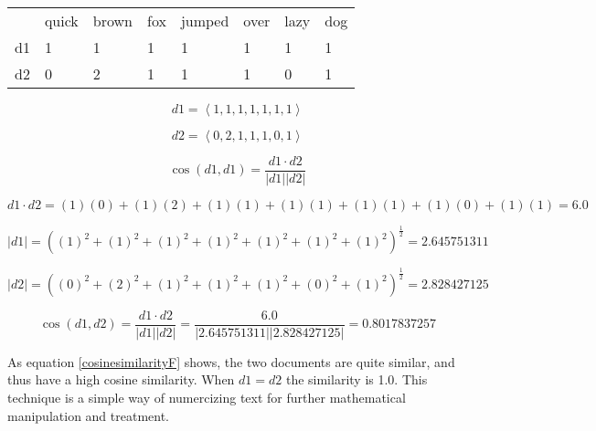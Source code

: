 \documentclass[12pt]{article}
\begin{document}
\begin{doublespacing}
\begin{table} \label{termtable}
    \begin{tabular}{llllllll}
    ~  & quick & brown & fox & jumped & over & lazy & dog \\
    d1 & 1     & 1     & 1   & 1      & 1    & 1    & 1   \\
    d2 & 0     & 2     & 1   & 1      & 1    & 0    & 1   \\
    \end{tabular}
\end{table}

\begin{equation} \label{d1termvector}
d1 = \left< 1, 1, 1, 1, 1, 1, 1 \right>
\end{equation}

\begin{equation} \label{d2termvector}
d2 = \left< 0, 2, 1, 1, 1, 0, 1 \right>
\end{equation}

\begin{equation} \label{cosinesimilarity}
\cos (d1,d1) = \frac{d1 \cdot d2 }{\left| d1 \right| \left| d2 \right|} 
\end{equation}

\begin{equation} \label{cosinesimilarity1}
 d1 \cdot d2 = (1)(0) + (1)(2) + (1)(1) + (1)(1) + (1)(1) + (1)(0) + (1)(1) = 6.0 
\end{equation}

\begin{equation} \label{cosinesimilarity2}
 \left| d1 \right| = \left( (1)^2 + (1)^2 + (1)^2 + (1)^2 + (1)^2 + (1)^2 + (1)^2 \right) ^{\frac{1}{2}} =  2.645751311
\end{equation}

\begin{equation} \label{cosinesimilarity3}
 \left| d2 \right| = \left( (0)^2 + (2)^2 + (1)^2 + (1)^2 + (1)^2 + (0)^2 + (1)^2 \right) ^{\frac{1}{2}} =  2.828427125
\end{equation}

\begin{equation} \label{cosinesimilarityF}
\cos (d1,d2) = \frac{d1 \cdot d2 }{\left| d1 \right| \left| d2 \right|} = \frac{6.0}{\left| 2.645751311 \right| \left| 2.828427125 \right|} = 0.8017837257
\end{equation}

As equation \ref{cosinesimilarityF} shows, the two documents are quite similar, and thus have a high cosine similarity.
When $d1 = d2$ the similarity is 1.0.
This technique is a simple way of numercizing text for further mathematical manipulation and treatment.



\end{doublespacing}
\end{document}
